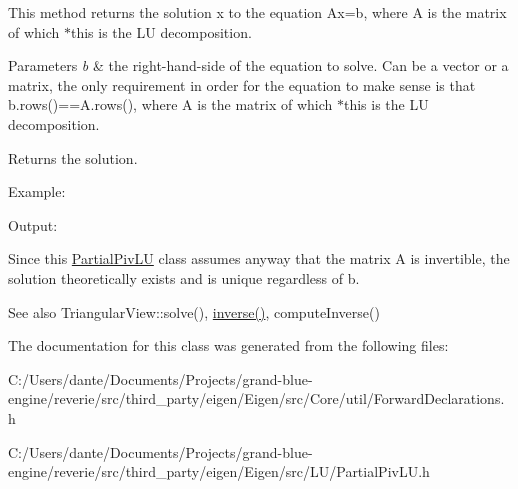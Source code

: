 This method returns the solution x to the equation Ax=b, where A is the matrix of which $\ast$this is the LU decomposition.


\begin{DoxyParams}{Parameters}
{\em b} & the right-\/hand-\/side of the equation to solve. Can be a vector or a matrix, the only requirement in order for the equation to make sense is that b.\+rows()==A.\+rows(), where A is the matrix of which $\ast$this is the LU decomposition.\\
\hline
\end{DoxyParams}
\begin{DoxyReturn}{Returns}
the solution.
\end{DoxyReturn}
Example\+: 
\begin{DoxyCodeInclude}{0}
\end{DoxyCodeInclude}
 Output\+: 
\begin{DoxyVerbInclude}
\end{DoxyVerbInclude}


Since this \mbox{\hyperlink{class_eigen_1_1_partial_piv_l_u}{Partial\+Piv\+LU}} class assumes anyway that the matrix A is invertible, the solution theoretically exists and is unique regardless of b.

\begin{DoxySeeAlso}{See also}
Triangular\+View\+::solve(), \mbox{\hyperlink{class_eigen_1_1_partial_piv_l_u_aef983470f92aba829e861e32e68681b5}{inverse()}}, compute\+Inverse() 
\end{DoxySeeAlso}


The documentation for this class was generated from the following files\+:\begin{DoxyCompactItemize}
\item 
C\+:/\+Users/dante/\+Documents/\+Projects/grand-\/blue-\/engine/reverie/src/third\+\_\+party/eigen/\+Eigen/src/\+Core/util/Forward\+Declarations.\+h\item 
C\+:/\+Users/dante/\+Documents/\+Projects/grand-\/blue-\/engine/reverie/src/third\+\_\+party/eigen/\+Eigen/src/\+L\+U/Partial\+Piv\+L\+U.\+h\end{DoxyCompactItemize}
